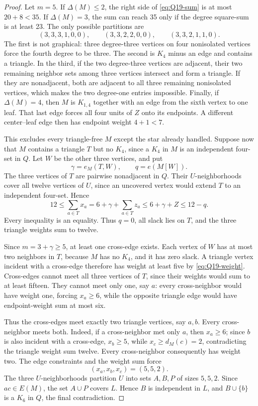 \documentclass[11pt,reqno,a4paper]{amsart}
\theoremstyle{definition}
\theoremstyle{remark}
\begin{document}
\begin{proof}
Let $m=5$.  If $\Delta(M)\leq2$, the right side of
\eqref{eq:Q19-sum} is at most $20+8<35$.  If $\Delta(M)=3$, the sum can
reach 35 only if the degree square-sum is at least 23.  The only possible
partitions are
\[
  (3,3,3,1,0,0),\qquad
  (3,3,2,2,0,0),\qquad
  (3,3,2,1,1,0).
\]
The first is not graphical: three degree-three vertices on four
nonisolated vertices force the fourth degree to be three.  The second is
$K_4$ minus an edge and contains a triangle.  In the third, if the two
degree-three vertices are adjacent, their two remaining neighbor sets among
three vertices intersect and form a triangle.  If they are nonadjacent,
both are adjacent to all three remaining nonisolated vertices, which makes
the two degree-one entries impossible.  Finally, if $\Delta(M)=4$, then
$M$ is $K_{1,4}$ together with an edge from the sixth vertex to one leaf.
That last edge forces all four units of $Z$ onto its endpoints.  A different
center--leaf edge then has endpoint weight $4+1<7$.

This excludes every triangle-free $M$ except the star already handled.
Suppose now that $M$ contains a triangle $T$ but no $K_4$, since a $K_4$ in
$M$ is an independent four-set in $Q$.  Let $W$ be the other three vertices,
and put
\[
  \gamma=e_M(T,W),\qquad q=e(M[W]).
\]
The three vertices of $T$ are pairwise nonadjacent in $Q$.  Their
$U$-neighborhoods cover all twelve vertices of $U$, since an uncovered
vertex would extend $T$ to an independent four-set.  Hence
\begin{equation}\label{eq:Q19-triangle-sum}
  12\leq\sum_{a\in T}x_a
  =6+\gamma+\sum_{a\in T}z_a
  \leq6+\gamma+Z
  \leq12-q.
\end{equation}
Every inequality is an equality.  Thus $q=0$, all slack lies on $T$, and
the three triangle weights sum to twelve.

Since $m=3+\gamma\geq5$, at least one cross-edge exists.  Each vertex of $W$
has at most two neighbors in $T$, because $M$ has no
$K_4$, and it has zero slack.  A triangle vertex incident with a cross-edge
therefore has weight at least five by \eqref{eq:Q19-weight}.  Cross-edges
cannot meet all three vertices of $T$, since their weights would sum to at
least fifteen.  They cannot meet only one, say $a$: every cross-neighbor
would have weight one, forcing $x_a\geq6$, while the opposite triangle edge
would have endpoint-weight sum at most six.

Thus the cross-edges meet exactly two triangle vertices, say $a,b$.  Every
cross-neighbor meets both.  Indeed, if a cross-neighbor met only $a$, then
$x_a\geq6$; since $b$ is also incident with a cross-edge, $x_b\geq5$, while
$x_c\geq d_M(c)=2$, contradicting the triangle weight sum twelve.  Every
cross-neighbor consequently has weight two.  The edge constraints and the
weight sum force
\[
  (x_a,x_b,x_c)=(5,5,2).
\]
The three $U$-neighborhoods partition $U$ into sets $A,B,P$ of sizes
$5,5,2$.  Since $ac\in E(M)$, the set $A\cup P$ covers $L$.  Hence $B$ is
independent in $L$, and $B\cup\{b\}$ is a $K_6$ in $Q$, the final
contradiction.
\end{proof}
\end{document}
